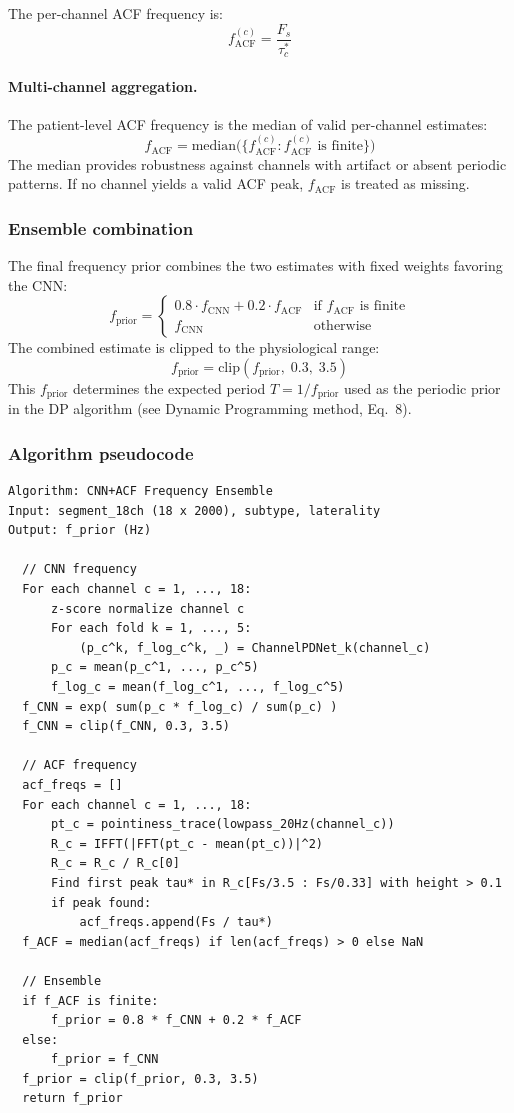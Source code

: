 The per-channel ACF frequency is:
\[ f_{\mathrm{ACF}}^{(c)} = \frac{F_s}{\tau^*_c} \tag{5} \]

\paragraph{Multi-channel aggregation.}
The patient-level ACF frequency is the median of valid per-channel estimates:
\[ f_{\mathrm{ACF}} = \mathrm{median}\!\big(\{f_{\mathrm{ACF}}^{(c)} : f_{\mathrm{ACF}}^{(c)} \text{ is finite}\}\big) \tag{6} \]
The median provides robustness against channels with artifact or absent periodic patterns. If no channel yields a valid ACF peak, $f_{\mathrm{ACF}}$ is treated as missing.

\subsubsection{Ensemble combination}

The final frequency prior combines the two estimates with fixed weights favoring the CNN:
\[ f_{\mathrm{prior}} = \begin{cases} 0.8 \cdot f_{\mathrm{CNN}} + 0.2 \cdot f_{\mathrm{ACF}} & \text{if } f_{\mathrm{ACF}} \text{ is finite} \\ f_{\mathrm{CNN}} & \text{otherwise} \end{cases} \tag{7} \]
The combined estimate is clipped to the physiological range:
\[ f_{\mathrm{prior}} = \mathrm{clip}(f_{\mathrm{prior}},\; 0.3,\; 3.5) \tag{8} \]
This $f_{\mathrm{prior}}$ determines the expected period $T = 1 / f_{\mathrm{prior}}$ used as the periodic prior in the DP algorithm (see Dynamic Programming method, Eq.~8).

\subsubsection{Algorithm pseudocode}

\begin{verbatim}
Algorithm: CNN+ACF Frequency Ensemble
Input: segment_18ch (18 x 2000), subtype, laterality
Output: f_prior (Hz)

  // CNN frequency
  For each channel c = 1, ..., 18:
      z-score normalize channel c
      For each fold k = 1, ..., 5:
          (p_c^k, f_log_c^k, _) = ChannelPDNet_k(channel_c)
      p_c = mean(p_c^1, ..., p_c^5)
      f_log_c = mean(f_log_c^1, ..., f_log_c^5)
  f_CNN = exp( sum(p_c * f_log_c) / sum(p_c) )
  f_CNN = clip(f_CNN, 0.3, 3.5)

  // ACF frequency
  acf_freqs = []
  For each channel c = 1, ..., 18:
      pt_c = pointiness_trace(lowpass_20Hz(channel_c))
      R_c = IFFT(|FFT(pt_c - mean(pt_c))|^2)
      R_c = R_c / R_c[0]
      Find first peak tau* in R_c[Fs/3.5 : Fs/0.33] with height > 0.1
      if peak found:
          acf_freqs.append(Fs / tau*)
  f_ACF = median(acf_freqs) if len(acf_freqs) > 0 else NaN

  // Ensemble
  if f_ACF is finite:
      f_prior = 0.8 * f_CNN + 0.2 * f_ACF
  else:
      f_prior = f_CNN
  f_prior = clip(f_prior, 0.3, 3.5)
  return f_prior
\end{verbatim}

